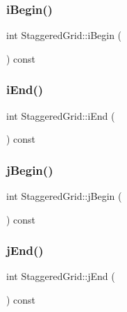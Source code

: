 \mbox{\label{classStaggeredGrid_afc4722bdd3f4d0a727c198caa95c2ac1}} 
\subsubsection{\texorpdfstring{iBegin()}{iBegin()}}
{\footnotesize\ttfamily int Staggered\+Grid\+::i\+Begin (\begin{DoxyParamCaption}{ }\end{DoxyParamCaption}) const}

\mbox{\label{classStaggeredGrid_ae3e5ae6bc27c81cf85db63a03d762643}} 
\subsubsection{\texorpdfstring{iEnd()}{iEnd()}}
{\footnotesize\ttfamily int Staggered\+Grid\+::i\+End (\begin{DoxyParamCaption}{ }\end{DoxyParamCaption}) const}

\mbox{\label{classStaggeredGrid_ab33ced44fb78f4168ffdfd8f7d1ab28e}} 
\subsubsection{\texorpdfstring{jBegin()}{jBegin()}}
{\footnotesize\ttfamily int Staggered\+Grid\+::j\+Begin (\begin{DoxyParamCaption}{ }\end{DoxyParamCaption}) const}

\mbox{\label{classStaggeredGrid_a96a400e04182e422c2dfc6b2d2aabaf1}} 
\subsubsection{\texorpdfstring{jEnd()}{jEnd()}}
{\footnotesize\ttfamily int Staggered\+Grid\+::j\+End (\begin{DoxyParamCaption}{ }\end{DoxyParamCaption}) const}

